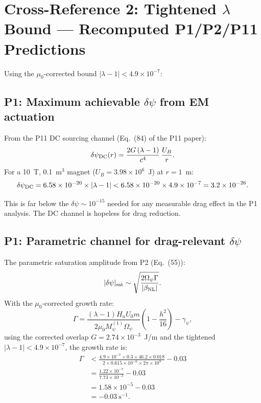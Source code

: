 \documentclass[11pt,twocolumn]{article}
\newcommand{\dpsi}{\delta\psi}
\newcommand{\lam}{\lambda}
\newcommand{\Opsi}{\Omega_\psi}
\newcommand{\gpsi}{\gamma_\psi}
\newcommand{\Mpsi}{M_\psi}
\begin{document}
\section{Cross-Reference 2: Tightened $\lam$ Bound --- Recomputed
P1/P2/P11 Predictions}
\label{sec:lambda_recompute}

Using the $\mu_0$-corrected bound $|\lam-1| < 4.9\times10^{-7}$:

\subsection{P1: Maximum achievable $\dpsi$ from EM actuation}

From the P11 DC sourcing channel (Eq.~(84) of the P11 paper):
\begin{equation}
\dpsi_{\rm DC}(r) = \frac{2G\,(\lam-1)}{c^4}\,\frac{U_B}{r}.
\end{equation}
For a 10~T, 0.1~m$^3$ magnet ($U_B = 3.98\times10^6$~J) at $r = 1$~m:
\begin{equation}
\dpsi_{\rm DC} = 6.58\times10^{-20} \times |\lam-1|
< 6.58\times10^{-20} \times 4.9\times10^{-7}
= 3.2\times10^{-26}.
\label{eq:dpsi_dc_max}
\end{equation}

This is far below the $\dpsi \sim 10^{-15}$ needed for any measurable
drag effect in the P1 analysis. The DC channel is hopeless for drag
reduction.

\subsection{P1: Parametric channel for drag-relevant $\dpsi$}

The parametric saturation amplitude from P2 (Eq.~(55)):
\begin{equation}
|\dpsi|_{\rm sat} \sim \sqrt{\frac{2\Opsi\Gamma}{|\beta_{\rm NL}|}}.
\end{equation}
With the $\mu_0$-corrected growth rate:
\begin{equation}
\Gamma = \frac{(\lam-1) H_n U_0 m}{2 \mu_0 \Mpsi^{(1)} \Opsi}
\left(1 - \frac{h^2}{16}\right) - \gpsi,
\end{equation}
using the corrected overlap $G = 2.74\times10^{-3}$~J/m and
the tightened $|\lam-1| < 4.9\times10^{-7}$, the growth rate is:
\begin{align}
\Gamma &< \frac{4.9\times10^{-7} \times 0.3 \times 46.2 \times 0.018}
{2 \times 0.615 \times 10^{-6} \times 2\pi\times10^9} - 0.03
\nonumber\\
&= \frac{1.22\times10^{-7}}{7.73\times10^{-3}} - 0.03
\nonumber\\
&= 1.58\times10^{-5} - 0.03
\nonumber\\
&= -0.03~\text{s}^{-1}.
\label{eq:gamma_corrected}
\end{align}
\end{document}
